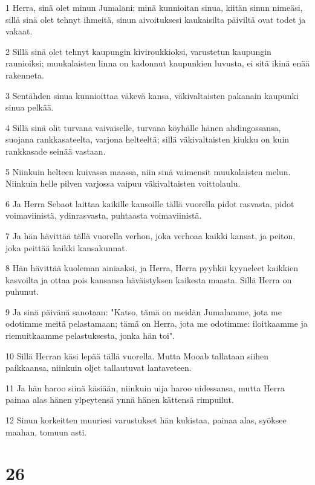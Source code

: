 \par 1 Herra, sinä olet minun Jumalani; minä kunnioitan sinua, kiitän sinun nimeäsi, sillä sinä olet tehnyt ihmeitä, sinun aivoituksesi kaukaisilta päiviltä ovat todet ja vakaat.
\par 2 Sillä sinä olet tehnyt kaupungin kiviroukkioksi, varustetun kaupungin raunioiksi; muukalaisten linna on kadonnut kaupunkien luvusta, ei sitä ikinä enää rakenneta.
\par 3 Sentähden sinua kunnioittaa väkevä kansa, väkivaltaisten pakanain kaupunki sinua pelkää.
\par 4 Sillä sinä olit turvana vaivaiselle, turvana köyhälle hänen ahdingossansa, suojana rankkasateelta, varjona helteeltä; sillä väkivaltaisten kiukku on kuin rankkasade seinää vastaan.
\par 5 Niinkuin helteen kuivassa maassa, niin sinä vaimensit muukalaisten melun. Niinkuin helle pilven varjossa vaipuu väkivaltaisten voittolaulu.
\par 6 Ja Herra Sebaot laittaa kaikille kansoille tällä vuorella pidot rasvasta, pidot voimaviinistä, ydinrasvasta, puhtaasta voimaviinistä.
\par 7 Ja hän hävittää tällä vuorella verhon, joka verhoaa kaikki kansat, ja peiton, joka peittää kaikki kansakunnat.
\par 8 Hän hävittää kuoleman ainiaaksi, ja Herra, Herra pyyhkii kyyneleet kaikkien kasvoilta ja ottaa pois kansansa häväistyksen kaikesta maasta. Sillä Herra on puhunut.
\par 9 Ja sinä päivänä sanotaan: "Katso, tämä on meidän Jumalamme, jota me odotimme meitä pelastamaan; tämä on Herra, jota me odotimme: iloitkaamme ja riemuitkaamme pelastuksesta, jonka hän toi".
\par 10 Sillä Herran käsi lepää tällä vuorella. Mutta Mooab tallataan siihen paikkaansa, niinkuin oljet tallautuvat lantaveteen.
\par 11 Ja hän haroo siinä käsiään, niinkuin uija haroo uidessansa, mutta Herra painaa alas hänen ylpeytensä ynnä hänen kättensä rimpuilut.
\par 12 Sinun korkeitten muuriesi varustukset hän kukistaa, painaa alas, syöksee maahan, tomuun asti.

\chapter{26}

